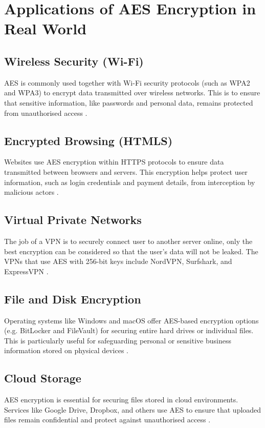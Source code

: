 \section{Applications of AES Encryption in Real World}

\subsection{Wireless Security (Wi-Fi)}
\Gls{AES} is commonly used together with Wi-Fi security protocols (such as WPA2 and WPA3) to encrypt data transmitted over wireless networks.
This is to ensure that sensitive information, like passwords and personal data, remains protected from unauthorised access \cite{cooper2025aes}.


\subsection{Encrypted Browsing (HTMLS)}
Websites use \gls{AES} encryption within HTTPS protocols to ensure data transmitted between browsers and servers.
This encryption helps protect user information, such as login credentials and payment details, from interception by malicious actors \cite{cooper2025aes}.


\subsection{Virtual Private Networks}
The job of a \gls{VPN} is to securely connect user to another server online, only the best encryption can be considered so that the user's data will not be leaked.
The \glspl{VPN} that use \gls{AES} with 256-bit keys include NordVPN, Surfshark, and ExpressVPN \cite{rimkiene2022aes}.


\subsection{File and Disk Encryption}
Operating systems like Windows and macOS offer \gls{AES}-based encryption options (e.g. BitLocker and FileVault) for securing entire hard drives or individual files.
This is particularly useful for safeguarding personal or sensitive business information stored on physical devices \cite{cooper2025aes}.


\subsection{Cloud Storage}
\Gls{AES} encryption is essential for securing files stored in cloud environments.
Services like Google Drive, Dropbox, and others use \gls{AES} to ensure that uploaded files remain confidential and protect against unauthorised access \cite{cooper2025aes}.


